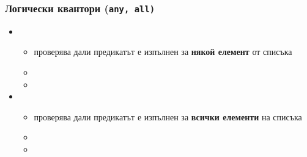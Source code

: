 \documentclass[alsotrans]{beamerswitch}
\begin{document}
\begin{frame}
  \frametitle{Логически квантори (\tt{any}, \tt{all})}

  \begin{itemize}[<+->]
  \item {}
    \begin{itemize}
    \item проверява дали предикатът е изпълнен за \textbf{някой елемент} от списъка
    \item {}
    \item {}
    \end{itemize}
  \item {}
    \begin{itemize}
    \item проверява дали предикатът е изпълнен за \textbf{всички елементи} на списъка
    \item {}
    \item {}
    \end{itemize}
  \end{itemize}
\end{frame}
\end{document}
